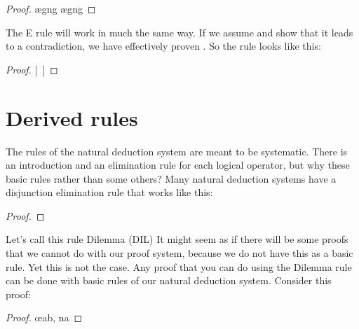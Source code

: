 \begin{proof}
	\open
		\ae{gng}
		\ae{gng}
	\close
\end{proof}

The {\enot}E rule will work in much the same way. If we assume \enot{} and show that it leads to a contradiction, we have effectively proven . So the rule looks like this:

\begin{proof}
\open
\close
{}[\ ]{}
\end{proof}


\section{Derived rules}
The rules of the natural deduction system are meant to be systematic. There is an introduction and an elimination rule for each logical operator, but why these basic rules rather than some others? Many natural deduction systems have a disjunction elimination rule that works like this:

\begin{proof}
	 
\end{proof}

Let's call this rule Dilemma (DIL) It might seem as if there will be some proofs that we cannot do with our proof system, because we do not have this as a basic rule. Yet this is not the case. Any proof that you can do using the Dilemma rule can be done with basic rules of our natural deduction system. Consider this proof:

\begin{proof}
	\open
		\open
		\close
		\open
		\close
		\oe{ab, na}
	\close
	 
\end{proof}

